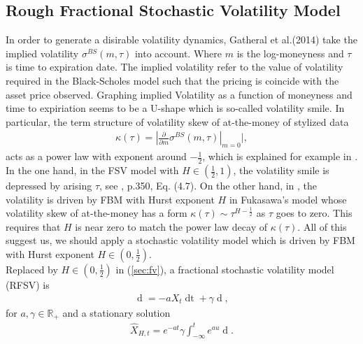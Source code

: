 \documentclass[a4paper, twoside, 11pt]{article}
\theoremstyle{definition}
\begin{document}
\subsection{Rough Fractional Stochastic Volatility Model}
In order to generate a disirable volatility dynamics, Gatheral et al.(2014) take the implied volatility $\sigma^{BS}(m, \tau)$ into account. Where $m$ is the log-moneyness and $\tau$ is time to expiration date. The implied volatility refer to the value of volatility required in the Black-Scholes model such that the pricing is coincide with the asset price observed.  Graphing implied Volatility as a function of moneyness and time to expiriation seems to be a U-shape which is so-called volatility smile. In particular, the term structure of volatility skew of at-the-money of stylized data
\begin{eqnarray*}
  \kappa(\tau)=|\frac{\partial}{\partial m}\sigma^{BS}(m, \tau)|_{m=0}|,
\end{eqnarray*}
acts as a power law with exponent around $-\frac{1}{2}$, which is explained for example in \cite{gradin}. In the one hand, in the FSV model with $H \in (\frac{1}{2}, 1)$, the volatility smile is depressed by arising $\tau$, see \cite{comteetla}, p.350, Eq. (4.7). On the other hand,  in \cite{fukasawa}, the volatility is driven by FBM with Hurst exponent $H$ in Fukasawa's model whose volatility skew of at-the-money has a form $\kappa(\tau) \sim \tau^{H-\frac{1}{2}}$ as $\tau$ goes to zero. This requires that $H$ is near zero to match the power law decay of $\kappa(\tau)$.  All of this suggest us, we should apply a stochastic volatility model which is driven by FBM with Hurst exponent $H \in (0, \frac{1}{2})$.\\
Replaced by $H \in (0, \frac{1}{2})$ in (\ref{sec:fv}), a fractional stochastic volatility model (RFSV) is
\begin{eqnarray}
  \mathop{dX_t} = -a X_t \mathop{dt} + \gamma \mathop{dU_H(t)},
  \label{sec:rfm}
\end{eqnarray}
for $a,\gamma \in \mathbb{R}_+$ and a stationary solution
\begin{eqnarray}
\hat{X}_{H,t}=e^{-at}\gamma\int_{-\infty}^t e^{au}\mathop{dU_H(u)}.
\label{sec:rfm2}
\end{eqnarray}
\end{document}
